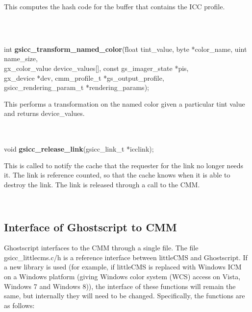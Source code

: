 \documentclass[12pt,notitlepage]{article}
\begin{document}
\begin{minipage}[h]{6.0in}
This computes the hash code for the buffer that  contains the ICC profile.
\end{minipage}\\
\\

\begin{tabbing}
\noindent int {\bf gsicc\_transform\_named\_color}(\=float tint\_value, byte *color\_name, uint name\_size,\\
\> gx\_color\_value device\_values[], const gs\_imager\_state *pis, \\
\> gx\_device *dev, cmm\_profile\_t *gs\_output\_profile, \\
\> gsicc\_rendering\_param\_t *rendering\_params);\\
\end{tabbing}

\begin{minipage}[h]{6.0in}
This performs a transformation on the named color given a particular tint value and returns device\_values.
\end{minipage}\\
\\

\noindent void {\bf gsicc\_release\_link}(gsicc\_link\_t *icclink);\\

\begin{minipage}[h]{6.0in}
	This is called to notify the cache that the requester for the link no longer needs it.  	
	The link is reference counted, so that the cache knows when it is able to destroy
	the link.  The link is released through a call to the CMM.
\end{minipage}\\

\singlespace

\subsection{Interface of Ghostscript to CMM}

Ghostscript interfaces to the CMM through a single file.  The file gsicc\_littlecms.c/h is a reference interface between littleCMS and Ghostscript.  If a new library is used (for example, if littleCMS is replaced with Windows ICM on a Windows platform (giving Windows color system (WCS) access on Vista, Windows 7 and Windows 8)), the interface of these functions will remain the same, but internally they will need to be changed.  Specifically, the functions are as follows:\\
\end{document}
